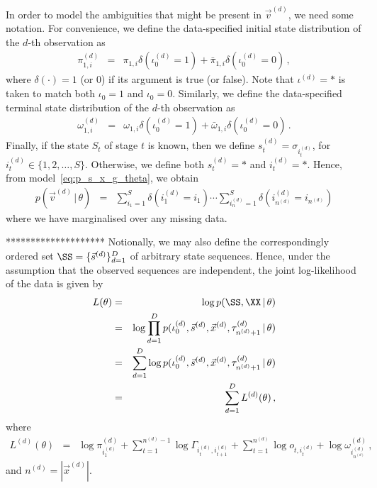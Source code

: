 \documentclass[a4paper]{article}
\begin{document}
In order to model the ambiguities that might be present in $\vec{v}^{(d)}$, we need some notation.
For convenience, we define the data-specified initial state distribution of the $d$-th observation as
\begin{eqnarray}
  \pi^{(d)}_{1,i} & = & \pi_{1,i}\delta(\iota_0^{(d)}=1)+\bar{\pi}_{1,i}\delta(\iota_0^{(d)}=0)\,,
\end{eqnarray}
where $\delta(\cdot)=1$ (or $0$) if its argument is true (or false). Note that $\iota^{(d)}=*$ is taken to match both $\iota_0=1$ and $\iota_0=0$.
Similarly, we define the data-specified terminal state distribution of the $d$-th observation as
\begin{eqnarray}
  \omega^{(d)}_{1,i} & = & \omega_{1,i}\delta(\iota_0^{(d)}=1)+\bar{\omega}_{1,i}\delta(\iota_0^{(d)}=0)\,.
\end{eqnarray}
Finally, if the state $S_t$ of stage $t$ is known, then we define $s^{(d)}_t=\sigma_{i_t^{(d)}}$, for $i^{(d)}_t\in\{1,2,\ldots,S\}$.
Otherwise, we define both $s^{(d)}_t=*$ and $i^{(d)}_t=*$.
Hence, from model~\eqref{eq:p_s_x_g_theta}, we obtain
\begin{eqnarray}
   p(\vec{v}^{(d)}\,|\,\theta) 
& = & 
   \sum_{i_1=1}^{S}\delta(i_1^{(d)}\!=\!i_1)\cdots\sum_{i_n^{(d)}=1}^{S}\delta(i_{n^{(d)}}^{(d)}\!=\!i_{n^{(d)}})

\end{eqnarray}
where we have marginalised over any missing data.

********************
Notionally, we may also define the correspondingly ordered set $\SS=\{\vec{s}^{(d)}\}_{d=1}^D$
of arbitrary state sequences.
Hence, under the assumption that the observed sequences are independent, the joint log-likelihood of the data is given by
\begin{eqnarray}
  L(\theta) & = & \log p(\SS,\XX\,|\,\theta) 
\nonumber\\& = & 
\log\prod_{d=1}^D 
p(\iota_0^{(d)},\vec{s}^{(d)},\vec{x}^{(d)},\tau_{n^{(d)}+1}^{(d)}\,|\,\theta) 
\nonumber\\& = & 
\sum_{d=1}^D\log 
p(\iota_0^{(d)},\vec{s}^{(d)},\vec{x}^{(d)},\tau_{n^{(d)}+1}^{(d)}\,|\,\theta) 
\nonumber\\& = & 
\sum_{d=1}^D L^{(d)}(\theta)
\,,
\end{eqnarray}
where
\begin{eqnarray}
  L^{(d)}(\theta) & = &
   \log\pi_{i_1^{(d)}}^{(d)}
 + \sum_{t=1}^{n^{(d)}-1}\log\Gamma_{i_t^{(d)},i_{t+1}^{(d)}}
 + \sum_{t=1}^{n^{(d)}}\log o_{t,i_t^{(d)}}
 + \log\omega_{i_{n^{(d)}}^{(d)}}^{(d)}
\,,
\end{eqnarray}
and $n^{(d)}=|\vec{x}^{(d)}|$.
\end{document}
